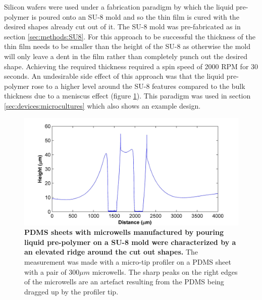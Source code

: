         Silicon wafers were used under a fabrication paradigm by which the liquid pre-polymer is poured onto an SU-8 mold and so the thin film is cured with the desired shapes already cut out of it. The SU-8 mold was pre-fabricated as in section \ref{sec:methods:SU8}. For this approach to be successful the thickness of the thin film needs to be smaller than the height of the SU-8 as otherwise the mold will only leave a dent in the film rather than completely punch out the desired shape. Achieving the required thickness required a spin speed of 2000 RPM for 30 seconds. An undesirable side effect of this approach was that the liquid pre-polymer rose to a higher level around the SU-8 features compared to the bulk thickness due to a meniscus effect (figure \ref{fig:methods:mwProfile}). This paradigm was used in section \ref{sec:devices:microcultures} which also shows an example design.

        \begin{figure}[h]
            \includegraphics[width=14cm]{chapter2/figures/mw_profile/mw_profile.jpg}

            \caption[Representative profile of a PDMS with microwells manufactured by spinning liquid pre-polymer on a SU-8 mold]{\textbf{PDMS sheets with microwells manufactured by pouring liquid pre-polymer on a SU-8 mold were characterized by a an elevated ridge around the cut out shapes.} The measurement was made with a micro-tip profiler on a PDMS sheet with a pair of \(300 \mu m\) microwells. The sharp peaks on the right edges of the microwells are an artefact resulting from the PDMS being dragged up by the profiler tip.}

              \label{fig:methods:mwProfile}
        \end{figure}


